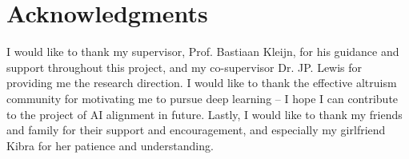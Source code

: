 \chapter*{Acknowledgments}
\label{C:ack}

I would like to thank my supervisor, Prof. Bastiaan Kleijn, for his guidance and support throughout this project, and my co-supervisor Dr. JP. Lewis for providing me the research direction. I would like to thank the effective altruism community for motivating me to pursue deep learning -- I hope I can contribute to the project of AI alignment in future. Lastly, I would like to thank my friends and family for their support and encouragement, and especially my girlfriend Kibra for her patience and understanding.

